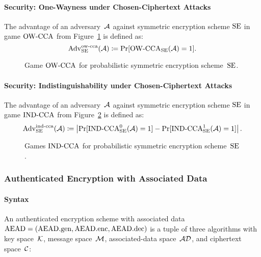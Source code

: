 \documentclass[a4paper,orivec]{llncs}
\begin{document}
\paragraph{Security: One-Wayness under Chosen-Ciphertext Attacks}
The advantage of an adversary~$\mathcal{A}$ against symmetric encryption scheme $\mathrm{SE}$ in game ${\mathrm{OW}\text{-}\mathrm{CCA}}$ from Figure~\ref{fig:sym:enc:ow:prob} is defined as:
\[
\mathrm{Adv}_{\mathrm{SE}}^{\mathrm{ow}\text{-}\mathrm{cca}}(\mathcal{A})\coloneqq\Pr[{\mathrm{OW}\text{-}\mathrm{CCA}}_{\mathrm{SE}}(\mathcal{A})=1]\text{.}
\]

\begin{figure}[!ht]
    \centering
    \nicoresetlinenr%
    \fbox{%
        \scalebox{\codescalefactor}{%
        }%
    }
    \caption{%
        Game ${\mathrm{OW}\text{-}\mathrm{CCA}}$ for probabilistic symmetric encryption scheme~$\mathrm{SE}$.
    }
    \label{fig:sym:enc:ow:prob}
\end{figure}

\paragraph{Security: Indistinguishability under Chosen-Ciphertext Attacks}
The advantage of an adversary~$\mathcal{A}$ against symmetric encryption scheme $\mathrm{SE}$ in game ${\mathrm{IND}\text{-}\mathrm{CCA}}$ from Figure~\ref{fig:sym:enc:ind:prob} is defined as:
\[
\mathrm{Adv}_{\mathrm{SE}}^{\mathrm{ind}\text{-}\mathrm{cca}}(\mathcal{A})\coloneqq\left|\Pr[{\mathrm{IND}\text{-}\mathrm{CCA}}_{\mathrm{SE}}^0(\mathcal{A})=1]-\Pr[{\mathrm{IND}\text{-}\mathrm{CCA}}_{\mathrm{SE}}^1(\mathcal{A})=1]\right|\text{.}
\]

\begin{figure}[!ht]
    \centering
    \nicoresetlinenr%
    \fbox{%
        \scalebox{\codescalefactor}{%
        }%
    }
    \caption{%
        Games ${\mathrm{IND}\text{-}\mathrm{CCA}}$ for probabilistic symmetric encryption scheme~$\mathrm{SE}$.
    }
    \label{fig:sym:enc:ind:prob}
\end{figure}


\subsubsection{Authenticated Encryption with Associated Data}

\paragraph{Syntax}
An authenticated encryption scheme with associated data $\mathrm{AEAD}=(\mathrm{AEAD}.\mathrm{gen},\mathrm{AEAD}.\mathrm{enc},\mathrm{AEAD}.\mathrm{dec})$ is a tuple of three algorithms with key space~$\mathcal{K}$, message space~$\mathcal{M}$, associated-data space~$\mathcal{AD}$, and ciphertext space~$\mathcal{C}$:
\end{document}
